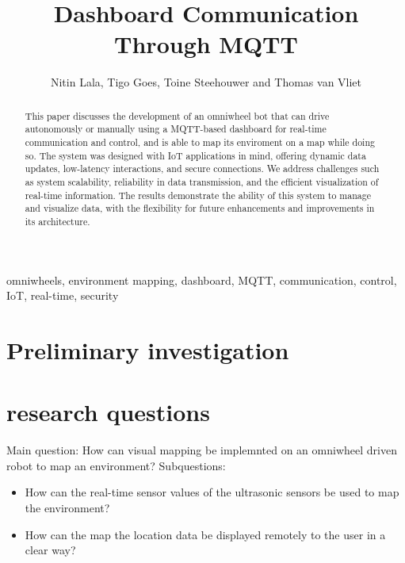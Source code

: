 \documentclass[conference]{IEEEtran}
\begin{document}
\title{Dashboard Communication Through MQTT}
\author{Nitin Lala, Tigo Goes, Toine Steehouwer and Thomas van Vliet}
\maketitle
\begin{abstract}
This paper discusses the development of an omniwheel bot that can drive autonomously or manually using a MQTT-based 
dashboard for real-time communication and control, and is able to map its enviroment on a map while doing so. 
The system was designed with IoT applications in mind, offering dynamic data updates, low-latency interactions, and 
secure connections. We address challenges such as system scalability, reliability in data transmission, and the efficient 
visualization of real-time information. The results demonstrate the ability of this system to manage and visualize data, with 
the flexibility for future enhancements and improvements in its architecture.
\end{abstract}




\begin{IEEEkeywords}
omniwheels, environment mapping, dashboard, MQTT, communication, control, IoT, real-time, security
\end{IEEEkeywords}





\section{Preliminary investigation}

\section{research questions}
Main question: 
How can visual mapping be implemnted on an omniwheel driven robot to map an environment?
Subquestions:
\begin{itemize}
    \item How can the real-time sensor values of the ultrasonic sensors be used to map the environment? 
    \item How can the map the location data be displayed remotely to the user in a clear way?

\end{itemize}







% 
% 
\end{document}
